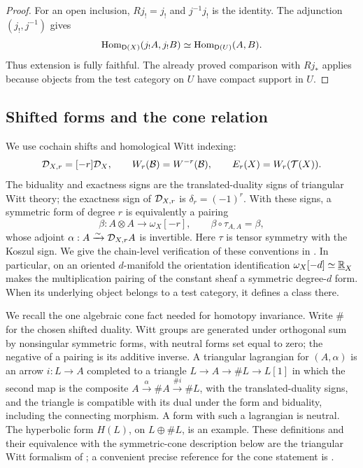 \begin{proof}
For an open inclusion, $Rj_!=j_!$ and $j^{-1}j_!$ is the identity.
The adjunction $(j_!,j^{-1})$ gives
\[
 \operatorname{Hom}_{\mathsf D(X)}(j_!A,j_!B)
 \simeq\operatorname{Hom}_{\mathsf D(U)}(A,B).
\]
Thus extension is fully faithful.  The already proved comparison with
$Rj_*$ applies because objects from the test category on $U$ have
compact support in $U$.
\end{proof}

\subsection{Shifted forms and the cone relation}

We use cochain shifts and homological Witt indexing:
\begin{equation}
 \label{cat:witt-indexing}
 \mathcal D_{X,r}=[-r]\mathcal D_X,
 \qquad W_r(\mathcal B)=W^{-r}(\mathcal B),
 \qquad E_r(X)=W_r(\mathcal T(X)).
\end{equation}
The biduality and exactness signs are the translated-duality signs of
triangular Witt theory; the exactness sign of $\mathcal D_{X,r}$ is
$\delta_r=(-1)^r$.  With these signs, a symmetric form of degree
$r$ is equivalently a pairing
\begin{equation}
 \label{cat:pairing-form}
 \beta:A\otimes A\longrightarrow\omega_X[-r],
 \qquad \beta\circ\tau_{A,A}=\beta,
\end{equation}
whose adjoint $\alpha:A\xrightarrow{\sim}\mathcal D_{X,r}A$ is invertible.
Here $\tau$ is tensor symmetry with the Koszul sign.  We give the
chain-level verification of these conventions in
.  In particular, on an oriented $d$-manifold
the orientation identification $\omega_X[-d]\simeq\underline{\mathbb R}_{X}$
makes the multiplication pairing of the constant sheaf a symmetric
degree-$d$ form.  When its underlying object belongs to a test category,
it defines a class there.

We recall the one algebraic cone fact needed for homotopy invariance.
Write $\#$ for the chosen shifted duality.
Witt groups are generated under orthogonal sum by nonsingular symmetric
forms, with neutral forms set equal to zero; the negative of a pairing
is its additive inverse.  A triangular lagrangian for $(A,\alpha)$ is
an arrow $i:L\to A$ completed to a triangle
$L\to A\to\#L\to L[1]$ in which the second map is the composite
$A\xrightarrow{\alpha}\#A\xrightarrow{\#i}\#L$,
with the translated-duality signs, and the triangle is compatible with
its dual under the form and biduality, including the connecting
morphism. A form with such a lagrangian is neutral. The hyperbolic form
$H(L)$, on
$L\oplus\#L$, is an example.  These definitions and their equivalence
with the symmetric-cone description below are the triangular Witt
formalism of \cite{Balmer2000}; a convenient precise reference for the
cone statement is \cite[\S2.1, Lemma~2.1]{Woolf2008}.

